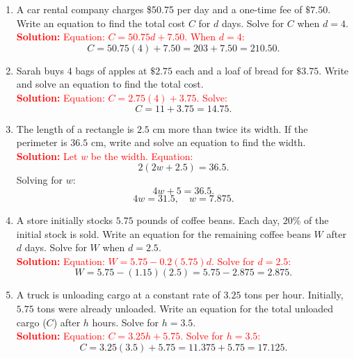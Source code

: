 \documentclass[12pt]{article}
\begin{document}
\begin{tcolorbox}[colframe=black!60, colback=white, 
coltitle=black, colbacktitle=black!15, fonttitle=\bfseries\Large, 
title=Problem Set - Answer Key, halign title=center, left=10pt, right=10pt, top=10pt, bottom=60pt]
\begin{enumerate}[itemsep=1em]
    \item A car rental company charges \$50.75 per day and a one-time fee of \( \$7.50 \). Write an equation to find the total cost \(C\) for \(d\) days. Solve for \(C\) when \(d = 4\).\\
    \textcolor{red}{\textbf{Solution:} Equation: \( C = 50.75d + 7.50 \). When \( d = 4 \):}
    \[
    C = 50.75(4) + 7.50 = 203 + 7.50 = 210.50.
    \]

    \item Sarah buys \( 4 \) bags of apples at \( \$2.75 \) each and a loaf of bread for \( \$3.75 \). Write and solve an equation to find the total cost.\\
    \textcolor{red}{\textbf{Solution:} Equation: \( C = 2.75(4) + 3.75 \). Solve:}
    \[
    C = 11 + 3.75 = 14.75.
    \]

    \item The length of a rectangle is \( 2.5 \) cm more than twice its width. If the perimeter is \( 36.5 \) cm, write and solve an equation to find the width.\\
    \textcolor{red}{\textbf{Solution:} Let \( w \) be the width. Equation:}
    \[
    2(2w + 2.5) = 36.5.
    \]
    Solving for \( w \):
    \[
    4w + 5 = 36.5.
    \]
    \[
    4w = 31.5, \quad w = 7.875.
    \]

    \item A store initially stocks \( 5.75 \) pounds of coffee beans. Each day, \( 20\% \) of the initial stock is sold. Write an equation for the remaining coffee beans \(W\) after \(d\) days. Solve for \(W\) when \(d = 2.5\).\\
    \textcolor{red}{\textbf{Solution:} Equation: \( W = 5.75 - 0.2(5.75)d \). Solve for \( d = 2.5 \):}
    \[
    W = 5.75 - (1.15)(2.5) = 5.75 - 2.875 = 2.875.
    \]

    \item A truck is unloading cargo at a constant rate of \( 3.25 \) tons per hour. Initially, \( 5.75 \) tons were already unloaded. Write an equation for the total unloaded cargo (\(C\)) after \(h\) hours. Solve for \(h = 3.5\).\\
    \textcolor{red}{\textbf{Solution:} Equation: \( C = 3.25h + 5.75 \). Solve for \( h = 3.5 \):}
    \[
    C = 3.25(3.5) + 5.75 = 11.375 + 5.75 = 17.125.
    \]
\end{enumerate}
\end{tcolorbox}
\end{document}
